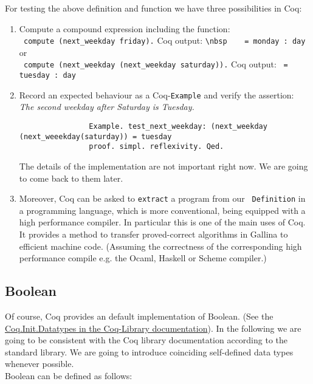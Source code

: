   For testing the above definition and function we have three possibilities in Coq:
     
   \begin{enumerate}
   \item Compute a compound expression including the function:\\ 		
 		 \lstinline! compute (next_weekday friday).! Coq output: \lstinline!\nbsp	 = monday : day ! or \\
 		 \lstinline! compute (next_weekday (next_weekday saturday)).! Coq output: \lstinline! = tuesday : day !\\ 	      
   \item Record an expected behaviour as a Coq-\lstinline!Example! and verify the assertion:\\ 
         {\itshape The second weekday after Saturday is Tuesday.}     
		   \begin{lstlisting}
		   		Example. test_next_weekday: (next_weekday (next_weeekday(saturday)) = tuesday 
		   		proof. simpl. reflexivity. Qed.
		   \end{lstlisting}
   			The details of the implementation are not important right now. 
   			We are going to come back to them later.
   
   \item \label{CoqAsCodeGen} Moreover, Coq can be asked to \lstinline!extract! a program from our \lstinline! Definition! in a programming language, which is more conventional, being equipped with a high performance compiler.
    In particular this is one of the main uses of Coq. 
    It provides a method to transfer proved-correct algorithms in Gallina to efficient machine code.
    (Assuming the correctness of the corresponding high performance compile e.g. the Ocaml, Haskell or Scheme compiler.) 			
   \end{enumerate}   

    


\subsection{Boolean}

    Of course, Coq provides an default implementation of Boolean.
    (See the \newline \href{https://www.cs.princeton.edu/courses/archive/fall07/cos595/stdlib/html/Coq.Init.Datatypes.html}{Coq.Init.Datatypes in the Coq-Library documentation}).  
    In the following we are going to be consistent with the Coq library documentation according to the standard library.
    We are going to introduce coinciding self-defined data types whenever possible.\\
    Boolean can be defined as follows:
    
